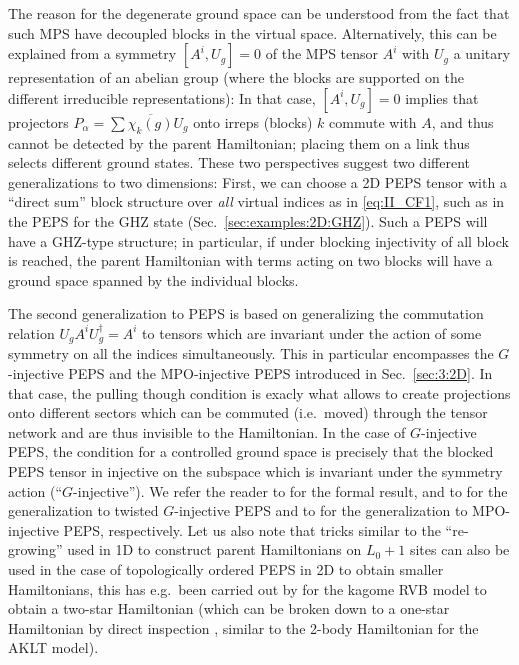 \documentclass[rmp,aps,reprint,superscriptaddress,nobalancelastpage]{revtex4-1}
\begin{document}
    The reason for the degenerate ground space can be understood from the fact that such MPS have decoupled blocks in the virtual space. Alternatively, this can be explained from a symmetry $[A^i,U_g]=0$ of the MPS tensor $A^i$ with $U_g$ a unitary representation of an abelian group (where the blocks are supported on the different irreducible representations): In that case, $[A^i,U_g]=0$ implies that projectors $P_\alpha=\sum \overline{\chi_k(g)} U_g$ onto irreps (blocks) $k$ commute with $A$, and thus cannot be detected by the parent Hamiltonian; placing them on a link thus selects different ground states. These two perspectives suggest two different generalizations to two dimensions: First, we can choose a 2D PEPS tensor with a ``direct sum'' block structure over \emph{all} virtual indices as in  \eqref{eq:II_CF1}, such as in the PEPS for the GHZ state (Sec.~\ref{sec:examples:2D:GHZ}).
    Such a PEPS will have a GHZ-type structure; in particular, if under blocking injectivity of all block is reached, the parent Hamiltonian with terms acting on two blocks will have a ground space spanned by the individual blocks.

    The second generalization to PEPS is based on generalizing the commutation relation $U_gA^iU_g^\dagger=A^i$ to tensors which are invariant under the action of some symmetry on all the indices simultaneously.  This in particular encompasses the $G$-injective PEPS and the MPO-injective PEPS introduced in Sec.~\ref{sec:3:2D}. In that case, the pulling though condition is exacly what allows to create projections onto different sectors which can be commuted (i.e.\ moved) through the tensor network and are thus invisible to the Hamiltonian.  In the case of $G$-injective PEPS, the condition for a controlled ground space is precisely that the blocked PEPS tensor in injective on the subspace which is invariant under the symmetry action (``$G$-injective'').  We refer the reader to  for the formal result, and to   for the generalization to twisted $G$-injective PEPS and to
     for the generalization to
    MPO-injective PEPS, respectively. Let us also note that tricks similar to the ``re-growing'' used in 1D to construct parent Hamiltonians on $L_0+1$ sites can also be used in the case of topologically ordered PEPS in 2D to obtain smaller Hamiltonians, this has e.g.\ been carried out by \citet[][Appendix D]{schuch:rvb-kagome} for the kagome RVB model to obtain a two-star Hamiltonian (which can be broken down to a one-star Hamiltonian by direct inspection \cite{zhou:rvb-parent-onestar}, similar to the 2-body Hamiltonian for the AKLT model).
\end{document}

